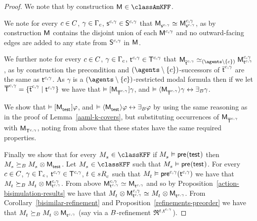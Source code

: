\begin{proof}
We note that by construction $\aModel \in \classAmKFF$.

We note for every $\agentC \in \agentsC$, $\gamma \in \Gamma_\agentC$, $\aStateS[\agentC, \gamma] \in \aStates[\agentC, \gamma]$ that $\aPModel{\aStateS[\agentC, \gamma]} \bisimilar \aPModel[\agentC, \gamma]{\aStateS[\agentC, \gamma]}$, as by construction $\aModel$ contains the disjoint union of each $\aModel[\agentC, \gamma]$ and no outward-facing edges are added to any state from $\aStates[\agentC, \gamma]$ in $\aModel$.

We further note for every $\agentC \in \agentsC$, $\gamma \in \Gamma_\agentC$, $\aStateT[\agentC, \gamma] \in \aStatesT[\agentC, \gamma]$ that $\aPModel{\aPStateT[\agentC, \gamma]} \bisimilar[(\agents \setminus \{\agentC\})] \aPModel[\agentC, \gamma]{\aStateT[\agentC, \gamma]}$, as by construction the precondition and $(\agents \setminus \{\agentC\})$-successors of $\aPStateT[\agentC, \gamma]$ are the same as $\aStateT[\agentC, \gamma]$.
As $\gamma$ is a $(\agents \setminus \{\agentC\})$-restricted modal formula then if we let $\aPStatesT[\agentC, \gamma] = \{\aPStateT[\agentC, \gamma] \mid \aStateT[\agentC, \gamma]\}$ we have that
$\entails \actionA{\aPModel{\aPStatesT[\agentC, \gamma]}} \gamma$, and
$\entails \actionE{\aPModel{\aPStatesT[\agentC, \gamma]}} \gamma \iff \someactsBs \gamma$.

We show that
$\entails \actionA{\aPModel{\aStateTest}} \phi$, and 
$\entails \actionE{\aPModel{\aStateTest}} \phi \iff \someactsBs \phi$
by using the same reasoning as in the proof of Lemma~\ref{aaml-k-covers},
but substituting occurrences of $\aPModel{\aPStatesT[\agentC, \gamma]}$ with $\aPModel{\aStatesT[\agentC, \gamma]}$, noting from above that these states have the same required properties.

Finally we show that for every $\kPModel{\kStateS} \in \classKFF$ if $\kPModel{\kStateS} \entails \aPrecondition(\aStateTest)$ then $\kPModel{\kStateS} \simulatesBs \kPModel{\kStateS} \exec \aPModel{\aStateTest}$.
Let $\kPModel{\kStateS} \in \classKFF$ such that $\kPModel{\kStateS} \entails \aPrecondition(\aStateTest)$.
For every $\agentC \in \agentsC$, $\gamma \in \Gamma_\agentC$, $\aStateT[\agentC, \gamma] \in \aStatesT[\agentC, \gamma]$, $\kStateT \in \kSuccessorsC{\kStateS}$ such that $\kPModel{\kStateT} \entails \aPrecondition[\agentC,\gamma](\aStateT[\agentC,\gamma])$ we have that $\kPModel{\kStateT} \simulatesBs \kPModel{\kStateT} \exec \aPModel[\agentC, \gamma]{\aStateT[\agentC, \gamma]}$.
From above $\aPModel[\agentC, \gamma]{\aStateT[\agentC, \gamma]} \bisimilar \aPModel{\aStateT[\agentC, \gamma]}$ and so by 
Proposition~\ref{action-bisimulation-results} we have that $\kPModel{\kStateT} \exec \aPModel[\agentC, \gamma]{\aStateT[\agentC, \gamma]} \bisimilar \kPModel{\kStateT} \exec \aPModel{\aStateT[\agentC, \gamma]}$.
From Corollary~\ref{bisimilar-refinement} and Proposition~\ref{refinements-preorder} we have that $\kPModel{\kStateT} \simulatesBs \kPModel{\kStateT} \exec \aPModel{\aStateT[\agentC, \gamma]}$ (say via a $\agentsB$-refinement $\refinement^{\kStateT, \aStateT[\agentC, \gamma]}$).


\end{proof}

